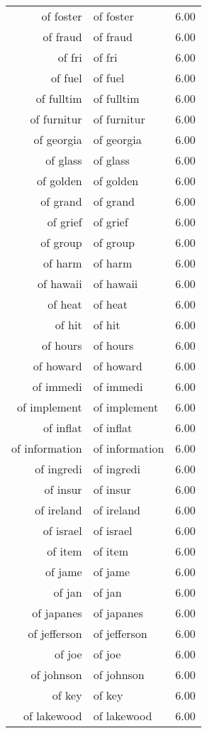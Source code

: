 \begin{table}[ht]
\begin{tabular}{rlr}
  of foster & of foster & 6.00 \\ 
  of fraud & of fraud & 6.00 \\ 
  of fri & of fri & 6.00 \\ 
  of fuel & of fuel & 6.00 \\ 
  of fulltim & of fulltim & 6.00 \\ 
  of furnitur & of furnitur & 6.00 \\ 
  of georgia & of georgia & 6.00 \\ 
  of glass & of glass & 6.00 \\ 
  of golden & of golden & 6.00 \\ 
  of grand & of grand & 6.00 \\ 
  of grief & of grief & 6.00 \\ 
  of group & of group & 6.00 \\ 
  of harm & of harm & 6.00 \\ 
  of hawaii & of hawaii & 6.00 \\ 
  of heat & of heat & 6.00 \\ 
  of hit & of hit & 6.00 \\ 
  of hours & of hours & 6.00 \\ 
  of howard & of howard & 6.00 \\ 
  of immedi & of immedi & 6.00 \\ 
  of implement & of implement & 6.00 \\ 
  of inflat & of inflat & 6.00 \\ 
  of information & of information & 6.00 \\ 
  of ingredi & of ingredi & 6.00 \\ 
  of insur & of insur & 6.00 \\ 
  of ireland & of ireland & 6.00 \\ 
  of israel & of israel & 6.00 \\ 
  of item & of item & 6.00 \\ 
  of jame & of jame & 6.00 \\ 
  of jan & of jan & 6.00 \\ 
  of japanes & of japanes & 6.00 \\ 
  of jefferson & of jefferson & 6.00 \\ 
  of joe & of joe & 6.00 \\ 
  of johnson & of johnson & 6.00 \\ 
  of key & of key & 6.00 \\ 
  of lakewood & of lakewood & 6.00 \\ 

\end{tabular}
\end{table}
